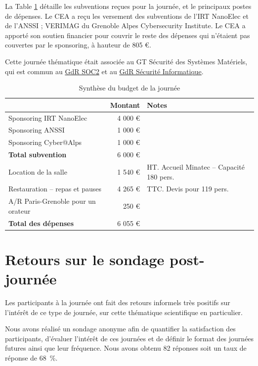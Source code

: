 \documentclass[a4paper,11pt]{article}
\begin{document}
La Table \ref{tab:org82047ca} détaille les subventions reçues pour la journée,
et le principaux postes de dépenses.
Le CEA a reçu les versement des subventions de l'IRT NanoElec et de
l'ANSSI ; VERIMAG du Grenoble Alpes Cybersecurity Institute.  Le CEA a apporté son
soutien financier pour couvrir le reste des dépenses qui n'étaient pas
couvertes par le sponsoring, à hauteur de 805 €.

Cette journée thématique était associée au GT Sécurité des Systèmes
Matériels, qui est commun au \href{http://www.gdr-soc.cnrs.fr}{GdR SOC2} et au \href{https://gdr-securite.irisa.fr}{GdR Sécurité Informatique}.

\begin{table}[htbp]
\caption{\label{tab:org82047ca}
Synthèse du budget de la journée}
\centering
\begin{tabular}{lrl}
\hline
 & Montant & Notes\\
\hline
Sponsoring IRT NanoElec & 4 000 € & \\
Sponsoring ANSSI & 1 000 € & \\
Sponsoring Cyber@Alps & 1 000 € & \\
\hline
\textbf{Total subvention} & 6 000 € & \\
\hline
\hline
Location de la salle & 1 540 € & HT. Accueil Minatec – Capacité 180 pers.\\
Restauration – repas et pauses & 4 265 € & TTC. Devis pour 119 pers.\\
A/R Paris-Grenoble pour un orateur & 250 € & \\
\hline
\textbf{Total des dépenses} & 6 055 € & \\
\hline
\end{tabular}
\end{table}

\section{Retours sur le sondage post-journée}
\label{sec:org1f3c058}

Les participants à la journée ont fait des retours informels très positifs sur
l'intérêt de ce type de journée, sur cette thématique scientifique en
particulier.

Nous avons réalisé un sondage anonyme afin de quantifier la satisfaction des participants, d'évaluer l'intérêt de ces journées et de définir le format des journées futures ainsi que leur fréquence.
Nous avons obtenu 82 réponses soit un taux de réponse de 68 \%.
\end{document}

